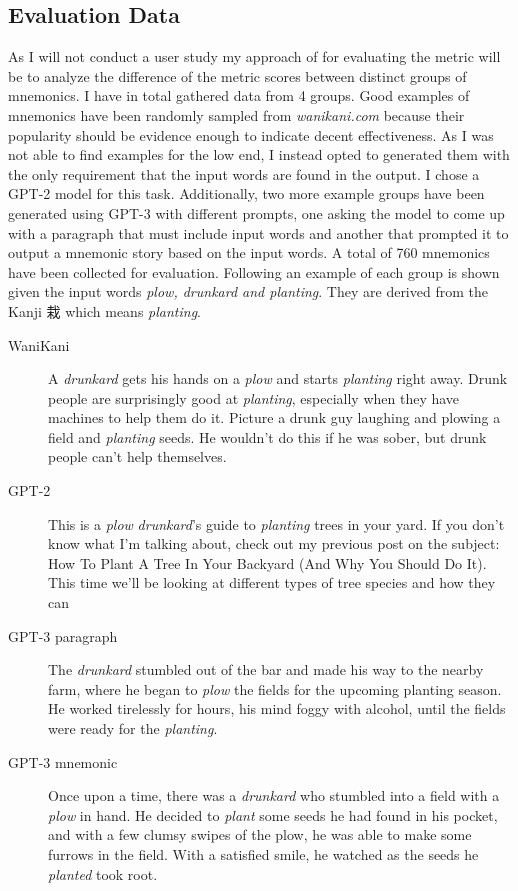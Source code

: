 \subsection{Evaluation Data} \label{sec:body_evaluation_data}

As I will not conduct a user study my approach of for evaluating the metric will be to analyze the difference of the metric scores between distinct groups of mnemonics. I have in total gathered data from 4 groups. Good examples of mnemonics have been randomly sampled from 
\emph{wanikani.com} because their popularity should be evidence enough to indicate decent effectiveness. As I was not able to find examples for the low end, I instead opted to generated them with the only requirement that the input words are found in the output. I chose a GPT-2 model for this task.  Additionally, two more example groups have been generated using GPT-3 with different prompts, one asking the model to come up with a paragraph that must include input words and another that prompted it to output a mnemonic story based on the input words. A total of 760 mnemonics have been collected for evaluation. Following an example of each group is shown given the input words \emph{plow, drunkard and planting}. They are derived from the Kanji 栽 which means \emph{planting}.
\begin{description}
    \item[WaniKani] A \emph{drunkard} gets his hands on a \emph{plow} and starts \emph{planting} right away. Drunk people are surprisingly good at \emph{planting}, especially when they have machines to help them do it. Picture a drunk guy laughing and plowing a field and \emph{planting} seeds. He wouldn't do this if he was sober, but drunk people can't help themselves.
    \item[GPT-2]  This is a \emph{plow} \emph{drunkard}'s guide to \emph{planting} trees in your yard. If you don't know what I'm talking about, check out my previous post on the subject: How To Plant A Tree In Your Backyard (And Why You Should Do It). This time we'll be looking at different types of tree species and how they can
    \item[GPT-3 paragraph] The \emph{drunkard} stumbled out of the bar and made his way to the nearby farm, where he began to \emph{plow} the fields for the upcoming planting season. He worked tirelessly for hours, his mind foggy with alcohol, until the fields were ready for the \emph{planting}.
    \item[GPT-3 mnemonic] Once upon a time, there was a \emph{drunkard} who stumbled into a field with a \emph{plow} in hand. He decided to \emph{plant} some seeds he had found in his pocket, and with a few clumsy swipes of the plow, he was able to make some furrows in the field. With a satisfied smile, he watched as the seeds he \emph{planted} took root. 
\end{description}
